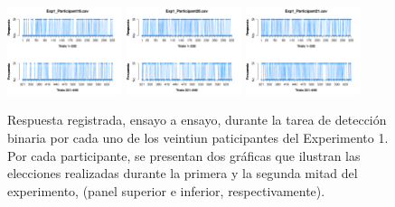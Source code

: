\begin{figure}[th]
\includegraphics[width=0.30\textwidth]{Figures/Response_Exp1_P19} \includegraphics[width=0.30\textwidth]{Figures/Response_Exp1_P20} \includegraphics[width=0.30\textwidth]{Figures/Response_Exp1_P21} 
\caption[Respuesta binaria registrda ensayo a ensayo; Experimento 1]{Respuesta registrada, ensayo a ensayo, durante la tarea de detección binaria por cada uno de los veintiun paticipantes del Experimento 1. Por cada participante, se presentan dos gráficas que ilustran las elecciones realizadas durante la primera y la segunda mitad del experimento, (panel superior e inferior, respectivamente).}
\label{fig:Response_E1}
\end{figure}

